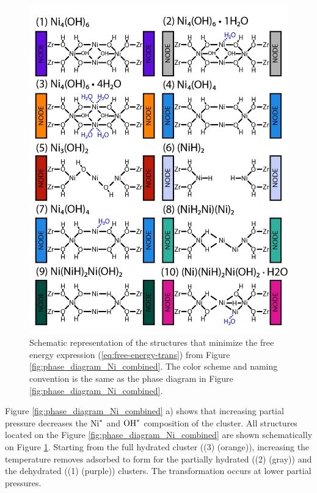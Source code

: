 \documentclass[journal=jctcce,manuscript=article]{achemso}
\begin{document}
\begin{figure}[H]
    \centering
    \includegraphics{zi-images/01-Ni-Graphics/2021-figure-structure-diagram-Ni_manuscript-structure.png}
    \caption{Schematic representation of the structures that minimize the free energy expression (\ref{eq:free-energy-trans}) from Figure \ref{fig:phase_diagram_Ni_combined}. The color scheme and naming convention is the same as the phase diagram in Figure \ref{fig:phase_diagram_Ni_combined}.}
    \label{fig:Ni-structure-diagram}
\end{figure}

Figure \ref{fig:phase_diagram_Ni_combined} a) shows that increasing  partial pressure decreases the $\ce{Ni^{*}}$ and $\ce{OH^{*}}$  composition of the cluster. All structures located on the Figure \ref{fig:phase_diagram_Ni_combined} are shown schematically on Figure \ref{fig:Ni-structure-diagram}. Starting from the full hydrated  cluster ((3)  (orange)), increasing the temperature removes adsorbed  to form for the partially hydrated ((2)  (gray)) and the dehydrated ((1)  (purple)) clusters. The transformation occurs at lower  partial pressures. 
\end{document}
